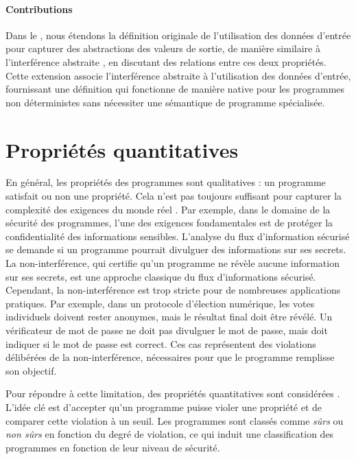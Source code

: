 {\paragraph{Contributions}

Dans le , nous étendons la définition originale de l'utilisation des données d'entrée pour capturer des abstractions des valeurs de sortie, de manière similaire à l'interférence abstraite , en discutant des relations entre ces deux propriétés. Cette extension associe l'interférence abstraite à l'utilisation des données d'entrée, fournissant une définition qui fonctionne de manière native pour les programmes non déterministes sans nécessiter une sémantique de programme spécialisée.

\section*{Propriétés quantitatives}

En général, les propriétés des programmes sont qualitatives : un programme satisfait ou non une propriété. Cela n'est pas toujours suffisant pour capturer la complexité des exigences du monde réel . Par exemple, dans le domaine de la sécurité des programmes, l'une des exigences fondamentales est de protéger la confidentialité des informations sensibles. L'analyse du flux d'information sécurisé se demande si un programme pourrait divulguer des informations sur ses secrets. La non-interférence, qui certifie qu'un programme ne révèle aucune information sur ses secrets, est une approche classique du flux d'informations sécurisé. Cependant, la non-interférence est trop stricte pour de nombreuses applications pratiques. Par exemple, dans un protocole d'élection numérique, les votes individuels doivent rester anonymes, mais le résultat final doit être révélé. Un vérificateur de mot de passe ne doit pas divulguer le mot de passe, mais doit indiquer si le mot de passe est correct. Ces cas représentent des violations délibérées de la non-interférence, nécessaires pour que le programme remplisse son objectif.

Pour répondre à cette limitation, des propriétés quantitatives sont considérées . L'idée clé est d'accepter qu'un programme puisse violer une propriété et de comparer cette violation à un seuil. Les programmes sont classés comme \emph{sûrs} ou \emph{non sûrs} en fonction du degré de violation, ce qui induit une classification des programmes en fonction de leur niveau de sécurité.

}
